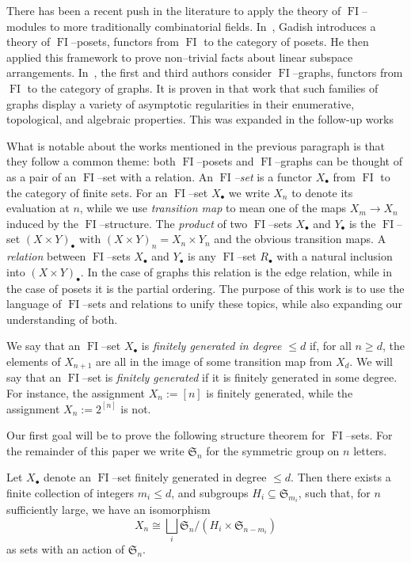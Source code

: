 \documentclass[ALCO,ThmDefs,Unicode,epreuves]{cedram}
\DeclareMathOperator{\FI}{FI}
\newcommand{\Sn}{\mathfrak{S}}
\newcommand{\dt}{\bullet}
\begin{document}
There has been a recent push in the literature to apply the theory of $\FI$--modules to more traditionally combinatorial fields. In~\cite{G}, Gadish introduces a theory of $\FI$--posets, functors from $\FI$ to the category of posets. He then applied this framework to prove non--trivial facts about linear subspace arrangements. In~\cite{RW}, the first and third authors consider $\FI$--graphs, functors from $\FI$ to the category of graphs. It is proven in that work that such families of graphs display a variety of asymptotic regularities in their enumerative, topological, and algebraic properties. This was expanded in the follow-up works~\cite{R2,RW2}

What is notable about the works mentioned in the previous paragraph is that they follow a common theme: both $\FI$--posets and $\FI$--graphs can be thought of as a pair of an $\FI$--set with a relation. An \emph{$\FI$--set} is a functor $X_\dt$ from $\FI$ to the category of finite sets. For an $\FI$--set $X_\dt$ we write $X_n$ to denote its evaluation at $n$, while we use \emph{transition map} to mean one of the maps $X_m \to X_n$ induced by the $\FI$--structure. The \emph{product} of two $\FI$--sets $X_{\dt}$ and $Y_{\dt}$ is the $\FI$--set $(X \times Y)_{\dt}$ with $(X \times Y)_n = X_n \times Y_n$ and the obvious transition maps. 
A \emph{relation} between $\FI$--sets $X_\dt$ and $Y_\dt$ is any $\FI$--set $R_{\dt}$ with a natural inclusion into $(X \times Y)_{\dt}$. In the case of graphs this relation is the edge relation, while in the case of posets it is the partial ordering. The purpose of this work is to use the language of $\FI$--sets and relations to unify these topics, while also expanding our understanding of both.

We say that an $\FI$--set $X_\dt$ is \emph{finitely generated in degree $\leq d$} if, for all $n \geq d$, the elements of $X_{n+1}$ are all in the image of some transition map from $X_d$. We will say that an $\FI$--set is \emph{finitely generated} if it is finitely generated in some degree. For instance, the assignment $X_n := [n]$ is finitely generated, while the assignment $X_n := 2^{[n]}$ is not.

Our first goal will be to prove the following structure theorem for $\FI$--sets. For the remainder of this paper we write $\Sn_n$ for the symmetric group on $n$ letters.

\begin{thmab}\label{structurethm}
Let $X_\dt$ denote an $\FI$--set finitely generated in degree $\leq d$. Then there exists a finite collection of integers $m_i \leq d$, and subgroups $H_i \subseteq \Sn_{m_i}$, such that, for $n$ sufficiently large, we have an isomorphism 
\[
X_n \cong \bigsqcup_i \Sn_n / (H_i \times \Sn_{n-m_i})
\]
as sets with an action of $\Sn_n$.
\end{thmab}
\end{document}

